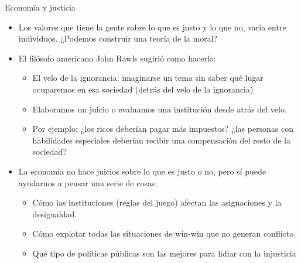 \documentclass{beamer}
\begin{document}
\begin{frame}{Economía y justicia}
    \begin{itemize}
        \item Los valores que tiene la gente sobre lo que es justo y lo que no, varía entre individuos. ¿Podemos construir una teoría de la moral?
        \item El filósofo americano John Rawls sugirió como hacerlo:
        \begin{itemize}
            \item El velo de la ignorancia: imaginarse un tema sin saber qué lugar ocuparemos en esa sociedad (detrás del velo de la ignorancia)
            \item Elaboramos un juicio o evaluamos una institución desde atrás del velo.
            \item Por ejemplo: ¿los ricos deberían pagar más impuestos? ¿las personas con habilidades especiales deberían recibir una compensación del resto de la sociedad? 
          \end{itemize}
        \item La economía no hace juicios sobre lo que es justo o no, pero sí puede ayudarnos a pensar una serie de cosas: 
        \begin{itemize}
        \item Cómo las instituciones (reglas del juego) afectan las asignaciones y la desigualdad.
        \item Cómo explotar todas las situaciones de win-win que no generan conflicto.
        \item Qué tipo de políticas públicas son las mejores para lidiar con la injusticia
    \end{itemize}
    \end{itemize}
\end{frame}
\end{document}
